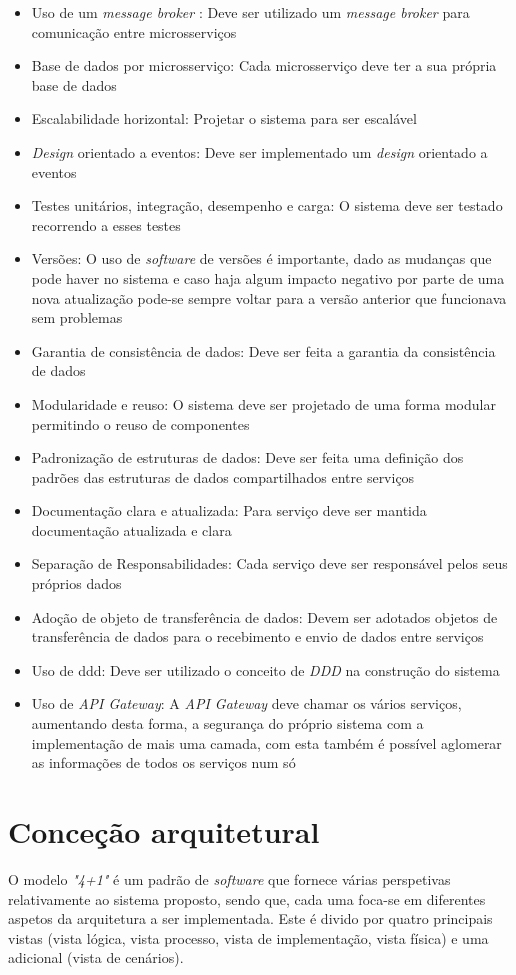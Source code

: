 \begin{itemize}
    \item Uso de um \textit{message broker} : Deve ser utilizado um \textit{message broker} para comunicação entre microsserviços
    \item Base de dados por microsserviço: Cada microsserviço deve ter a sua própria base de dados
    \item Escalabilidade horizontal: Projetar o sistema para ser escalável
    \item \textit{Design} orientado a eventos: Deve ser implementado um \textit{design} orientado a eventos
    \item Testes unitários, integração, desempenho e carga: O sistema deve ser testado recorrendo a esses testes
    \item Versões: O uso de \textit{software} de versões é importante, dado as mudanças que pode haver no sistema e caso haja algum impacto negativo por parte de uma nova atualização pode-se sempre voltar para a versão anterior que funcionava sem problemas
    \item Garantia de consistência de dados: Deve ser feita a garantia da consistência de dados 
    \item Modularidade e reuso: O sistema deve ser projetado de uma forma modular permitindo o reuso de componentes 
    \item Padronização de estruturas de dados: Deve ser feita uma definição dos padrões das estruturas de dados compartilhados entre serviços
    \item Documentação clara e atualizada: Para serviço deve ser mantida documentação atualizada e clara
    \item Separação de Responsabilidades: Cada serviço deve ser responsável pelos seus próprios dados
    \item Adoção de objeto de transferência de dados: Devem ser adotados objetos de transferência de dados para o recebimento e envio de dados entre serviços
    \item Uso de \ac{ddd}: Deve ser utilizado o conceito de \textit{DDD} na construção do sistema
    \item Uso de \textit{API Gateway}: A \textit{API Gateway} deve chamar os vários serviços, aumentando desta forma, a segurança do próprio sistema com a implementação de mais uma camada, com esta também é possível aglomerar as informações de todos os serviços num só
\end{itemize}


\section{Conceção arquitetural}
O modelo \textit{"4+1"} é um padrão de \textit{software} que fornece várias perspetivas relativamente ao sistema proposto, sendo que, cada uma foca-se em diferentes aspetos da arquitetura a ser implementada. Este é divido por quatro principais vistas (vista lógica, vista processo, vista de implementação, vista física) e uma adicional (vista de cenários).

